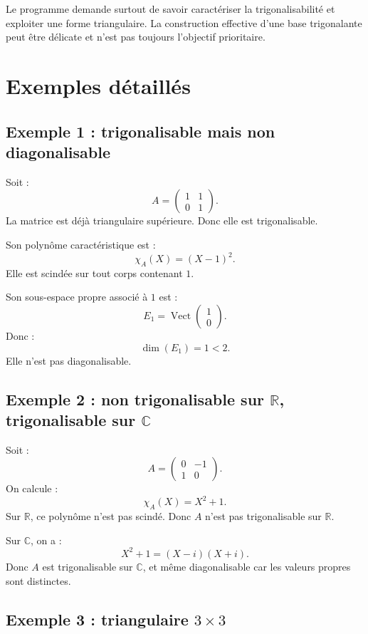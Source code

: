 \documentclass[11pt,a4paper]{article}
\newcommand{\R}{\mathbb R}
\newcommand{\C}{\mathbb C}
\newcommand{\Vect}{\operatorname{Vect}}
\begin{document}
\begin{erreurbox}
Le programme demande surtout de savoir caractériser la trigonalisabilité et exploiter une forme triangulaire.  
La construction effective d'une base trigonalante peut être délicate et n'est pas toujours l'objectif prioritaire.
\end{erreurbox}

\section{Exemples détaillés}

\subsection{Exemple 1 : trigonalisable mais non diagonalisable}

Soit :
\[
A=
\begin{pmatrix}
1&1\\
0&1
\end{pmatrix}.
\]
La matrice est déjà triangulaire supérieure.  
Donc elle est trigonalisable.

Son polynôme caractéristique est :
\[
\chi_A(X)=(X-1)^2.
\]
Elle est scindée sur tout corps contenant \(1\).

Son sous-espace propre associé à \(1\) est :
\[
E_1=\Vect
\begin{pmatrix}
1\\0
\end{pmatrix}.
\]
Donc :
\[
\dim(E_1)=1<2.
\]
Elle n'est pas diagonalisable.

\subsection{Exemple 2 : non trigonalisable sur \(\R\), trigonalisable sur \(\C\)}

Soit :
\[
A=
\begin{pmatrix}
0&-1\\
1&0
\end{pmatrix}.
\]
On calcule :
\[
\chi_A(X)=X^2+1.
\]
Sur \(\R\), ce polynôme n'est pas scindé.  
Donc \(A\) n'est pas trigonalisable sur \(\R\).

Sur \(\C\), on a :
\[
X^2+1=(X-i)(X+i).
\]
Donc \(A\) est trigonalisable sur \(\C\), et même diagonalisable car les valeurs propres sont distinctes.

\subsection{Exemple 3 : triangulaire \(3\times3\)}
\end{document}
